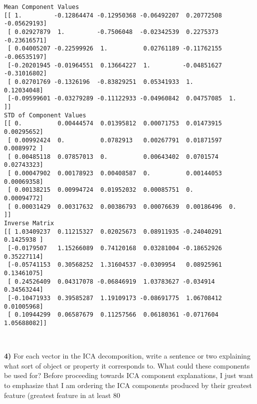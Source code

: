 \documentclass{article}
\begin{document}
    \begin{Verbatim}[commandchars=\\\{\}]
Mean Component Values
[[ 1.         -0.12864474 -0.12950368 -0.06492207  0.20772508 -0.05629193]
 [ 0.02927879  1.         -0.7506048  -0.02342539  0.2275373  -0.23616571]
 [ 0.04005207 -0.22599926  1.          0.02761189 -0.11762155 -0.06535197]
 [-0.20201945 -0.01964551  0.13664227  1.         -0.04851627 -0.31016802]
 [ 0.02701769 -0.1326196  -0.83829251  0.05341933  1.          0.12034048]
 [-0.09599601 -0.03279289 -0.11122933 -0.04960842  0.04757085  1.        ]]
STD of Component Values
[[ 0.          0.00444574  0.01395812  0.00071753  0.01473915  0.00295652]
 [ 0.00992424  0.          0.0782913   0.00267791  0.01871597  0.0089972 ]
 [ 0.00485118  0.07857013  0.          0.00643402  0.0701574   0.02743323]
 [ 0.00047902  0.00178923  0.00408587  0.          0.00144053  0.00069358]
 [ 0.00138215  0.00994724  0.01952032  0.00085751  0.          0.00094772]
 [ 0.00031429  0.00317632  0.00386793  0.00076639  0.00186496  0.        ]]
Inverse Matrix
[[ 1.03409237  0.11215327  0.02025673  0.08911935 -0.24040291  0.1425938 ]
 [-0.0179507   1.15266089  0.74120168  0.03281004 -0.18652926  0.35227114]
 [-0.05741153  0.30568252  1.31604537 -0.0309954   0.08925961  0.13461075]
 [ 0.24526409  0.04317078 -0.06846919  1.03783627 -0.034914    0.34563244]
 [-0.10471933  0.39585287  1.19109173 -0.08691775  1.06708412  0.01005968]
 [ 0.10944299  0.06587679  0.11257566  0.06180361 -0.0717604   1.05688082]]
    \end{Verbatim}

    \begin{center}
    \end{center}
    { \hspace*{\fill} \\}
    
    \textbf{4)} For each vector in the ICA decomposition, write a sentence
or two explaining what sort of object or property it corresponds to.
What could these components be used for?
Before proceeding towards ICA component explanations, I just want to emphasize that I am ordering the ICA components produced by their greatest feature (greatest feature in at least 80%
\end{document}
